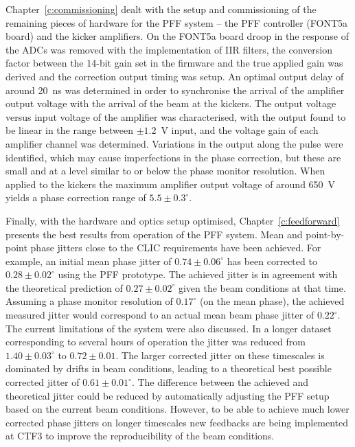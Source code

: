 Chapter~\ref{c:commissioning} dealt with the setup and commissioning of the remaining pieces of hardware for the PFF system -- the PFF controller (FONT5a board) and the kicker amplifiers. On the FONT5a board droop in the response of the ADCs was removed with the implementation of IIR filters, the conversion factor between the 14-bit gain set in the firmware and the true applied gain was derived and the correction output timing was setup. An optimal output delay of around 20~ns was determined in order to synchronise the arrival of the amplifier output voltage with the arrival of the beam  at the kickers. The output voltage versus input voltage of the amplifier was characterised, with the output found to be linear in the range between \(\pm1.2\)~V input, and the voltage gain of each amplifier channel was determined. Variations in the output along the pulse were identified, which may cause imperfections in the phase correction, but these are small and at a level similar to or below the phase monitor resolution. When applied to the kickers the maximum amplifier output voltage of around 650~V yields a phase correction range of \(5.5\pm0.3^\circ\).

Finally, with the hardware and optics setup optimised, Chapter~\ref{c:feedforward} presents the best results from operation of the PFF system. Mean and point-by-point phase jitters close to the CLIC requirements have been achieved. For example, an initial mean phase jitter of \(0.74\pm0.06^\circ\) has been corrected to \(0.28\pm0.02^\circ\) using the PFF prototype. The achieved jitter is in agreement with the theoretical prediction of \(0.27\pm0.02^\circ\) given the beam conditions at that time. 
Assuming a phase monitor resolution of \(0.17^\circ\) (on the mean phase), the achieved measured jitter would correspond to an actual mean beam phase jitter of \(0.22^\circ\). 
The current limitations of the system were also discussed. In a longer dataset corresponding to several hours of operation the jitter was reduced from \(1.40\pm0.03^\circ\) to \(0.72\pm0.01\). The larger corrected jitter on these timescales is dominated by drifts in beam conditions, leading to a theoretical best possible corrected jitter of \(0.61\pm0.01^\circ\). The difference between the achieved and theoretical jitter could be reduced by automatically adjusting the PFF setup based on the current beam conditions. However, to be able to achieve much lower corrected phase jitters on longer timescales new feedbacks are being implemented at CTF3 to improve the reproducibility of the beam conditions. 

